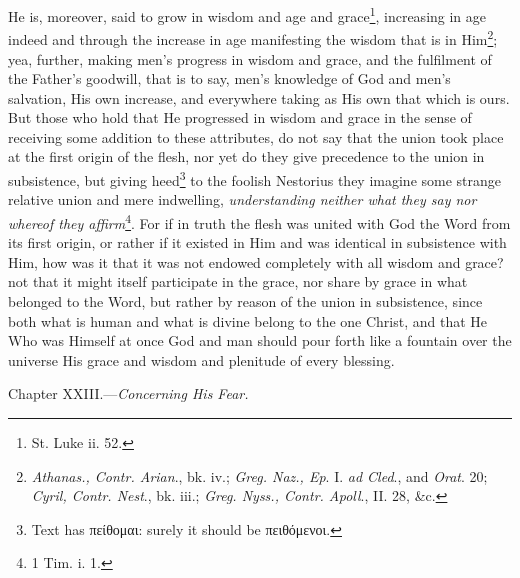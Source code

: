 He is, moreover, said to grow in wisdom and age and grace\footnote{St. Luke ii. 52.}, increasing in age indeed and through the increase in age manifesting the wisdom that is in Him\footnote{\emph{Athanas., Contr. Arian}., bk. iv.; \emph{Greg. Naz., Ep}. I. \emph{ad Cled}., and \emph{Orat}. 20; \emph{Cyril, Contr. Nest}., bk. iii.; \emph{Greg. Nyss., Contr. Apoll}., II. 28, \&c.}; yea, further, making men’s progress in wisdom and grace, and the fulfilment of the Father’s goodwill, that is to say, men’s knowledge of God and men’s salvation, His own increase, and everywhere taking as His own that which is ours. But those who hold that He progressed in wisdom and grace in the sense of receiving some addition to these attributes, do not say that the union took place at the first origin of the flesh, nor yet do they give precedence to the union in subsistence, but giving heed\footnote{Text has \textgreek{πείθομαι}: surely it should be \textgreek{πειθόμενοι}.} to the foolish Nestorius they imagine some strange relative union and mere indwelling, \emph{understanding neither what they say nor whereof they affirm}\footnote{1 Tim. i. 1.}. For if in truth the flesh was united with God the Word from its first origin, or rather if it existed in Him and was identical in subsistence with Him, how was it that it was not endowed completely with all wisdom and grace? not that it might itself participate in the grace, nor share by grace in what belonged to the Word, but rather by reason of the union in subsistence, since both what is human and what is divine belong to the one Christ, and that He Who was Himself at once God and man should pour forth like a fountain over the universe His grace and wisdom and plenitude of every blessing.


Chapter XXIII.—\emph{Concerning His Fear.}


